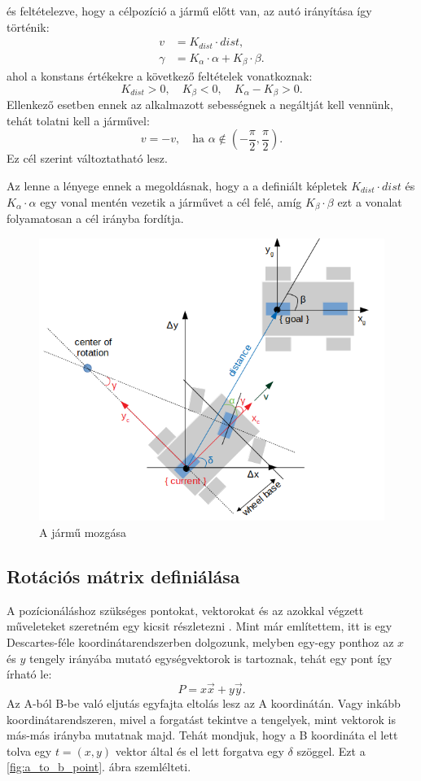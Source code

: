 és feltételezve, hogy a célpozíció a jármű előtt van, az autó irányítása így történik:
\begin{align*}
v &= K_{dist} \cdot dist, \\
\gamma &= K_\alpha \cdot \alpha + K_\beta \cdot \beta.
\end{align*}
ahol a konstans értékekre a következő feltételek vonatkoznak:
\[
K_{dist} > 0, \quad K_\beta < 0, \quad K_\alpha - K_\beta > 0.
\]
Ellenkező esetben ennek az alkalmazott sebességnek a negáltját kell vennünk, tehát tolatni kell a járművel:
\[
v = -v, \quad \text{ha }\alpha \not\in \left(-\dfrac{\pi}{2}, \dfrac{\pi}{2} \right).
\]
Ez cél szerint változtatható lesz.

Az lenne a lényege ennek a megoldásnak, hogy a a definiált képletek $ K_{dist} \cdot dist $ és $ K_\alpha \cdot \alpha $ egy vonal mentén vezetik a járművet a cél felé, amíg $ K_\beta \cdot \beta $ ezt a vonalat folyamatosan a cél irányba fordítja.

\begin{figure}[h!]
\centering
\includegraphics[scale=0.70]{images/moving_vehicle.png}
\caption{A jármű mozgása}
\label{fig:moving_vehicle}
\end{figure}

\subsection{Rotációs mátrix definiálása}

A pozícionáláshoz szükséges pontokat, vektorokat és az azokkal végzett műveleteket szeretném egy kicsit részletezni \cite{weisstein2003rotation}. Mint már említettem, itt is egy Descartes-féle koordinátarendszerben dolgozunk, melyben egy-egy ponthoz az $ x $ és $ y $ tengely irányába mutató egységvektorok is tartoznak, tehát egy pont így írható le:
\[
P = x\vec{x} + y\vec{y}.
\]
Az A-ból B-be való eljutás egyfajta eltolás lesz az A koordinátán. Vagy inkább koordinátarendszeren, mivel a forgatást tekintve a tengelyek, mint vektorok is más-más irányba mutatnak majd. Tehát mondjuk, hogy a B koordináta el lett tolva egy $t = (x, y)$ vektor által és el lett forgatva egy $\delta$ szöggel. Ezt a \ref{fig:a_to_b_point}. ábra szemlélteti.

